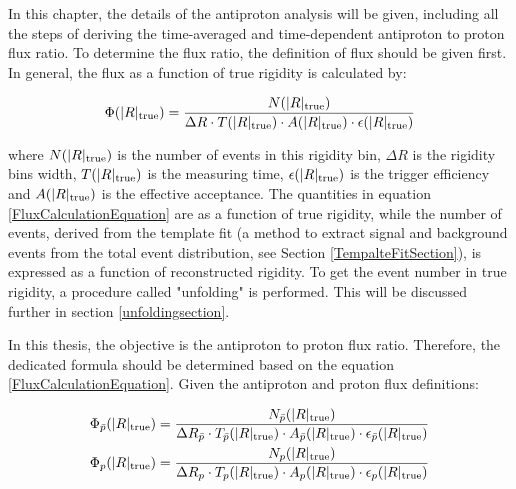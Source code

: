 
 \label{ChapterAnalysis}


In this chapter, the details of the antiproton analysis will be given, including all the steps of deriving the time-averaged and time-dependent antiproton to proton flux ratio. To determine the flux ratio, the definition of flux should be given first. In general, the flux as a function of true rigidity is calculated by: 

\begin{equation}
\label{FluxCalculationEquation}
\Phi(|R|_{\rm{true}}) = \frac{N(|R|_{\rm{true}})}{\Delta R \cdot T(|R|_{\rm{true}}) \cdot A(|R|_{\rm{true}}) \cdot \epsilon(|R|_{\rm{true}}) }
\end{equation}

where $N(|R|_{\rm{true}})$ is the number of events in this rigidity bin, $\Delta R$ is the rigidity bins width, $T(|R|_{\rm{true}})$ is the measuring time, $\epsilon(|R|_{\rm{true}})$ is the trigger efficiency and $A(|R|_{\rm{true}})$ is the effective acceptance. The quantities in equation \ref{FluxCalculationEquation} are as a function of true rigidity, while the number of events, derived from the template fit (a method to extract signal and background events from the total event distribution, see Section \ref{TempalteFitSection}), is expressed as a function of reconstructed rigidity. To get the event number in true rigidity, a procedure called "unfolding" is performed. This will be discussed further in section \ref{unfoldingsection}.  \par


In this thesis, the objective is the antiproton to proton flux ratio. Therefore, the dedicated formula should be determined based on the equation \ref{FluxCalculationEquation}. Given the antiproton and proton flux definitions:

\begin{equation} 
\begin{aligned}  
\Phi_{\bar{p}}(|R|_{\rm{true}}) =  \frac{N_{\bar{p}}(|R|_{\rm{true}})}{\Delta R_{\bar{p}} \cdot T_{\bar{p}}(|R|_{\rm{true}}) \cdot A_{\bar{p}}(|R|_{\rm{true}}) \cdot \epsilon_{\bar{p}}(|R|_{\rm{true}}) }\\
\Phi_{p}(|R|_{\rm{true}}) =  \frac{N_{p}(|R|_{\rm{true}})}{\Delta R_{p} \cdot T_{p}(|R|_{\rm{true}}) \cdot A_{p}(|R|_{\rm{true}}) \cdot \epsilon_{p}(|R|_{\rm{true}}) }
\end{aligned}
\end{equation}

